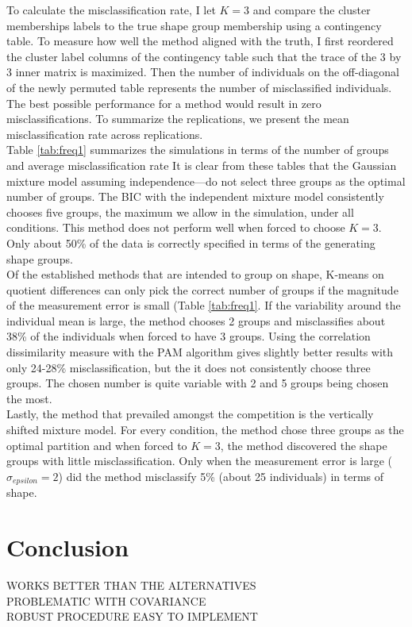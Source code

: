 \documentclass[12pt]{article}
\begin{document}
To calculate the misclassification rate, I let $K=3$ and compare the cluster memberships labels to the true shape group membership using a contingency table. To measure how well the method aligned with the truth, I first reordered the cluster label columns of the contingency table such that the trace of the 3 by 3 inner matrix is maximized. Then the number of individuals on the off-diagonal of the newly permuted table represents the number of misclassified individuals. The best possible performance for a method would result in zero misclassifications. To summarize the replications, we present the mean misclassification rate across replications.\\

Table \ref{tab:freq1} summarizes the simulations in terms of the number of groups and average misclassification rate It is clear from these tables that the Gaussian mixture model assuming independence---do not select three groups as the optimal number of groups. The BIC with the independent mixture model consistently chooses five groups, the maximum we allow in the simulation, under all conditions. This method does not perform well when forced to choose $K=3$. Only about 50\% of the data is correctly specified in terms of the generating shape groups.\\

Of the established methods that are intended to group on shape, K-means on quotient differences can only pick the correct number of groups if the magnitude of the measurement error is small (Table \ref{tab:freq1}. If the variability around the individual mean is large, the method chooses 2 groups and misclassifies about 38\% of the individuals when forced to have 3 groups. Using the correlation dissimilarity measure with the PAM algorithm gives slightly better results with only 24-28\% misclassification, but the it does not consistently choose three groups. The chosen number is quite variable with 2 and 5 groups being chosen the most.\\

Lastly, the method that prevailed amongst the competition is the vertically shifted mixture model. For every condition, the method chose three groups as the optimal partition and when forced to $K=3$, the method discovered the shape groups with little misclassification. Only when the measurement error is large ($\sigma_{epsilon}=2$) did the method misclassify 5\% (about 25 individuals) in terms of shape. \\ 
\section{Conclusion}
 WORKS BETTER THAN THE ALTERNATIVES\\
 PROBLEMATIC WITH COVARIANCE\\
 ROBUST PROCEDURE EASY TO IMPLEMENT
\end{document}
